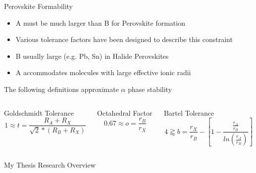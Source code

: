\documentclass[10pt, aspectratio=169, presentation]{beamer}
\begin{document}
\begin{frame}[label={sec:orge41d492}]{Perovskite Formability}
\begin{itemize}
\item A must be much larger than B for Perovskite formation
\item Various tolerance factors have been designed to describe this constraint
\item B usually large (e.g. Pb, Sn) in Halide Perovskites
\item A accommodates \alert{molecules} with large effective ionic radii\autocite{kieslich-2015-exten-toler}
\end{itemize}

The following definitions approximate \(\alpha\) phase stability
\autocite{yin-2015-halid-perov,bartel-2019-new-toler}
\begin{columns}
\begin{column}{0.33\columnwidth}
\begin{block}{Goldschmidt Tolerance}
\[
1 \approx t = \frac{R_A+R_X}{\sqrt{2}*(R_B+R_X)}
\]
\end{block}
\end{column}

\begin{column}{0.33\columnwidth}
\begin{block}{Octahedral Factor}
\[
0.67 \approx o=\frac{r_B}{r_X}
\]
\end{block}
\end{column}

\begin{column}{0.33\columnwidth}
\begin{block}{Bartel Tolerance}
\[
4 \gtrapprox b = \frac{r_X}{r_B}-\left[ 1-\frac{\frac{r_A}{r_B}}{ln(\frac{r_A}{r_B})} \right]
\]
\end{block}
\end{column}
\end{columns}
\end{frame}

\begin{frame}[label={sec:org780adf3}]{My Thesis Research Overview}
\end{frame}
\end{document}
